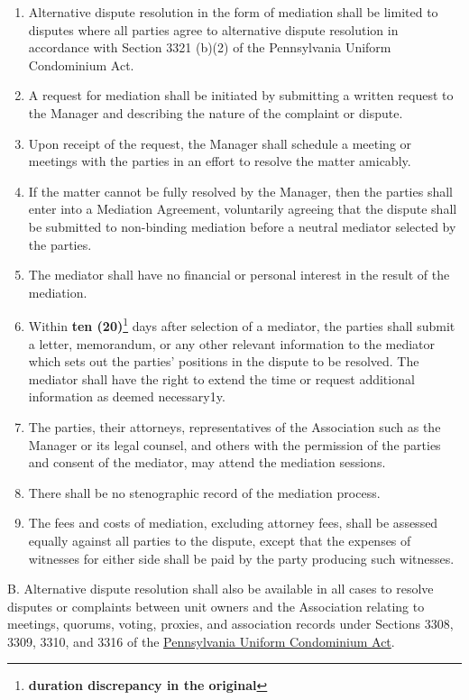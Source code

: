 \documentclass[
]{book}
\begin{document}
\begin{enumerate}
\def\labelenumi{\arabic{enumi}.}
\item
  Alternative dispute resolution in the form of mediation shall be limited to disputes where all parties agree to alternative dispute resolution in accordance with Section 3321 (b)(2) of the Pennsylvania Uniform Condominium Act.
\item
  A request for mediation shall be initiated by submitting a written request to the Manager and describing the nature of the complaint or dispute.
\item
  Upon receipt of the request, the Manager shall schedule a meeting or meetings with the parties in an effort to resolve the matter amicably.
\item
  If the matter cannot be fully resolved by the Manager, then the parties shall enter into a Mediation Agreement, voluntarily agreeing that the dispute shall be submitted to non-binding mediation before a neutral mediator selected by the parties.
\item
  The mediator shall have no financial or personal interest in the result of the mediation.
\item
  Within \textbf{ten (20)}\footnote{\textbf{duration discrepancy in the original}} days after selection of a mediator, the parties shall submit a letter, memorandum, or any other relevant information to the mediator which sets out the parties' positions in the dispute to be resolved. The mediator shall have the right to extend the time or request additional information as deemed necessary1y.
\item
  The parties, their attorneys, representatives of the Association such as the Manager or its legal counsel, and others with the permission of the parties and consent of the mediator, may attend the mediation sessions.
\item
  There shall be no stenographic record of the mediation process.
\item
  The fees and costs of mediation, excluding attorney fees, shall be assessed equally against all parties to the dispute, except that the expenses of witnesses for either side shall be paid by the party producing such witnesses.
\end{enumerate}

B. Alternative dispute resolution shall also be available in all cases to resolve disputes or complaints between unit owners and the Association relating to meetings, quorums, voting, proxies, and association records under Sections 3308, 3309, 3310, and 3316 of the \href{https://www.ncsl.org/documents/environ/PAcondo.pdf}{Pennsylvania Uniform Condominium Act}.
\end{document}
